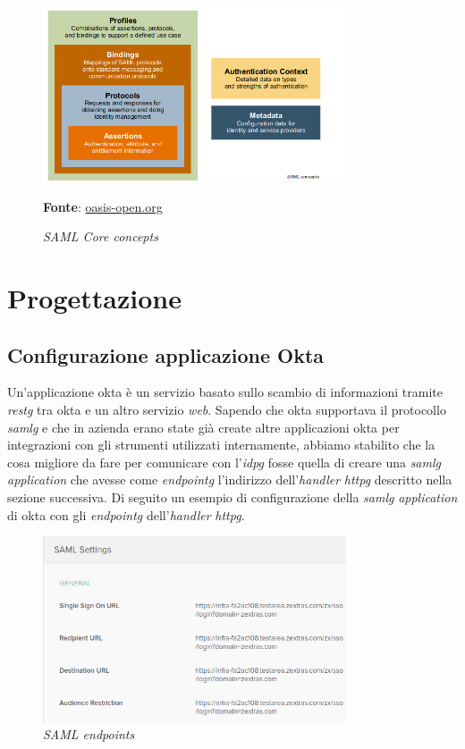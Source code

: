     \begin{figure}[ht]
        \centering
        \includegraphics[width=0.8\textwidth]{immagini/SAMLCore.png}
        \caption{\textit{SAML Core concepts}}
        \textbf{Fonte}:
        \href{https://www.oasis-open.org/committees/download.php/27819/sstc-saml-tech-overview-2.0-cd-02.pdf}{oasis-open.org}
        \label{fig: SAML core}
    \end{figure}

\section{Progettazione}
\subsection{Configurazione applicazione Okta}
Un'applicazione \gls{okta} è un servizio basato sullo scambio di informazioni tramite \textit{\gls{restg}} tra \gls{okta} e un altro servizio \textit{web}. Sapendo che \gls{okta} supportava il protocollo \textit{\gls{samlg}} e che in azienda erano state già create altre applicazioni \gls{okta} per integrazioni con gli strumenti utilizzati internamente, abbiamo stabilito che la cosa migliore da fare per comunicare con l'\textit{\gls{idpg}} fosse quella di creare una \textit{\gls{samlg}} \textit{application} che avesse come \textit{\gls{endpointg}} l'indirizzo dell'\textit{handler} \textit{\gls{httpg}} descritto nella sezione successiva.
Di seguito un esempio di configurazione della \textit{\gls{samlg}} \textit{application} di \gls{okta} con gli \textit{\gls{endpointg}} dell'\textit{handler} \textit{\gls{httpg}}.

    \begin{figure}[ht]
        \centering
        \includegraphics[width=0.8\textwidth]{immagini/endpoints.png}
        \caption{\textit{SAML endpoints}}
        \label{fig: SAML endpoints}
    \end{figure}
    

